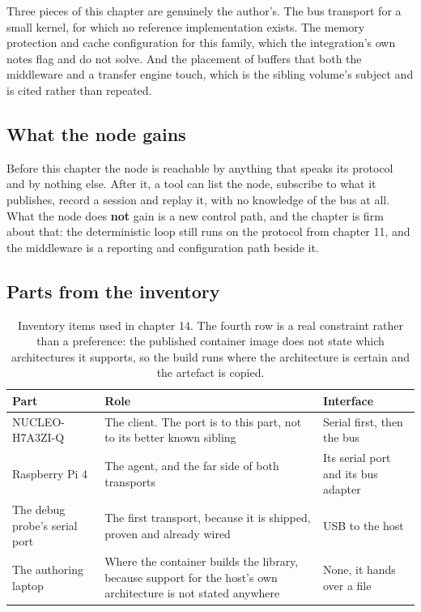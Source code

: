 Three pieces of this chapter are genuinely the author's. The bus transport for a
small kernel, for which no reference implementation exists. The memory
protection and cache configuration for this family, which the integration's own
notes flag and do not solve. And the placement of buffers that both the
middleware and a transfer engine touch, which is the sibling volume's subject
and is cited rather than repeated.

\subsection*{What the node gains}

Before this chapter the node is reachable by anything that speaks its protocol
and by nothing else. After it, a tool can list the node, subscribe to what it
publishes, record a session and replay it, with no knowledge of the bus at all.
What the node does \textbf{not} gain is a new control path, and the chapter is
firm about that: the deterministic loop still runs on the protocol from chapter
11, and the middleware is a reporting and configuration path beside it.

\subsection*{Parts from the inventory}

\begin{table}[H]\centering\small
\begin{tabular}{p{40mm}p{66mm}p{40mm}}
\toprule
Part & Role & Interface \\
\midrule
NUCLEO-H7A3ZI-Q & The client. The port is to this part, not to its better known
sibling & Serial first, then the bus \\
Raspberry Pi 4 & The agent, and the far side of both transports & Its serial port
and its bus adapter \\
The debug probe's serial port & The first transport, because it is shipped,
proven and already wired & USB to the host \\
The authoring laptop & Where the container builds the library, because support
for the host's own architecture is not stated anywhere & None, it hands over a
file \\
\bottomrule
\end{tabular}
\caption{Inventory items used in chapter 14. The fourth row is a real constraint rather than a preference: the published container image does not state which architectures it supports, so the build runs where the architecture is certain and the artefact is copied.}
\end{table}

